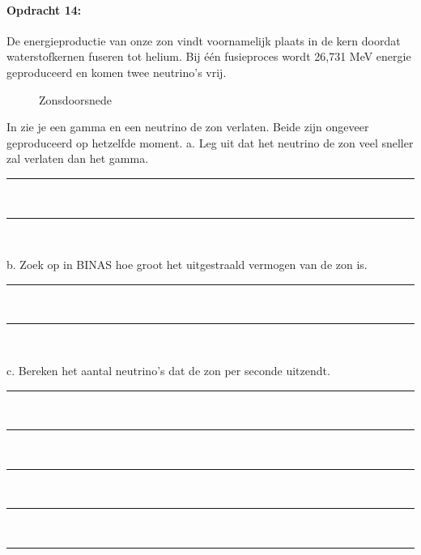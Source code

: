 \paragraph{Opdracht 14:}
De energieproductie van onze zon vindt voornamelijk plaats in de kern doordat 
waterstofkernen fuseren tot helium.
Bij één fusieproces wordt 26,731 \si{MeV} energie geproduceerd en komen 
twee neutrino's vrij.\\
\begin{figure}
\centering
{}
\caption{Zonsdoorsnede} 
\label{fig:Zonsdoorsnede}
\end{figure}
In  zie je een gamma en een neutrino de zon 
verlaten. Beide zijn ongeveer geproduceerd op hetzelfde moment. 
a. Leg uit dat het neutrino de zon veel sneller zal verlaten dan het gamma.
\begin{center}
    \rule{\textwidth}{0.3mm}\\
    \rule{\textwidth}{0.3mm}\\
\end{center} 
b. Zoek op in BINAS hoe groot het uitgestraald vermogen van de zon is.
\begin{center}
    \rule{\textwidth}{0.3mm}\\
    \rule{\textwidth}{0.3mm}\\
\end{center}
c. Bereken het aantal neutrino's dat de zon per seconde uitzendt.
\begin{center}
    \rule{\textwidth}{0.3mm}\\
    \rule{\textwidth}{0.3mm}\\
    \rule{\textwidth}{0.3mm}\\
    \rule{\textwidth}{0.3mm}\\
    \rule{\textwidth}{0.3mm}\\
\end{center}
